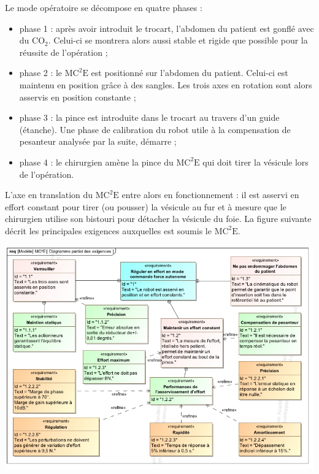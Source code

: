 \documentclass[10pt,fleqn]{article} %
\begin{document}
Le mode opératoire se décompose en quatre phases :
\begin{itemize}
\item phase 1 : après avoir introduit le trocart, l’abdomen du patient est gonflé avec du $\text{CO}_2$. Celui-ci se montrera alors aussi stable et rigide que possible pour la réussite de l’opération ;
\item phase 2 : le $\text{MC}^2\text{E}$ est positionné sur l’abdomen du patient. Celui-ci est maintenu en position grâce à des sangles. Les trois axes en rotation sont alors asservis en position constante ;
\item phase 3 : la pince est introduite dans le trocart au travers d’un guide (étanche). Une phase de calibration du robot utile à la compensation de pesanteur analysée par la suite, démarre ;
\item phase 4 : le chirurgien amène la pince du $\text{MC}^2\text{E}$ qui doit tirer la vésicule lors de l’opération. 
\end{itemize}
L’axe en translation du $\text{MC}^2\text{E}$ entre alors en fonctionnement : il est asservi en effort constant pour tirer (ou pousser) la vésicule au fur et à mesure que le chirurgien utilise son bistouri pour détacher la vésicule du foie. La figure suivante décrit les principales exigences auxquelles est soumis le $\text{MC}^2\text{E}$.

\begin{center}
\includegraphics[width=\linewidth]{images/Sujet/images/fig_05}
\end{center}
\end{document}
